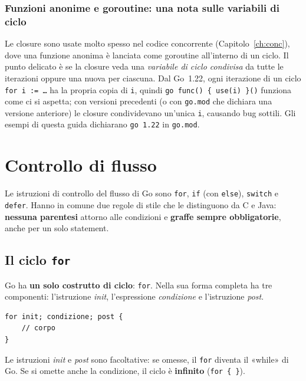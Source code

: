 \documentclass[11pt,a4paper]{report}
\newcommand{\cod}[1]{\texttt{#1}}
\begin{document}
\subsection{Funzioni anonime e goroutine: una nota sulle variabili di ciclo}

Le closure sono usate molto spesso nel codice concorrente (Capitolo~\ref{ch:conc}),
dove una funzione anonima è lanciata come goroutine all'interno di un ciclo. Il
punto delicato è se la closure veda una \emph{variabile di ciclo condivisa} da
tutte le iterazioni oppure una nuova per ciascuna. Dal Go~1.22, ogni iterazione
di un ciclo \cod{for i := \ldots} ha la propria copia di \cod{i}, quindi
\cod{go func() \{ use(i) \}()} funziona come ci si aspetta; con versioni
precedenti (o con \texttt{go.mod} che dichiara una versione anteriore) le closure
condividevano un'unica \cod{i}, causando bug sottili. Gli esempi di questa guida
dichiarano \cod{go 1.22} in \texttt{go.mod}.

\chapter{Controllo di flusso}\label{ch:flusso}

Le istruzioni di controllo del flusso di Go sono \cod{for}, \cod{if} (con
\cod{else}), \cod{switch} e \cod{defer}. Hanno in comune due regole di stile
che le distinguono da C e Java: \textbf{nessuna parentesi} attorno alle
condizioni e \textbf{graffe sempre obbligatorie}, anche per un solo statement.

\section{Il ciclo \texttt{for}}\label{sec:for}

Go ha \textbf{un solo costrutto di ciclo}: \cod{for}. Nella sua forma completa ha
tre componenti: l'istruzione \emph{init}, l'espressione \emph{condizione} e
l'istruzione \emph{post}.

\begin{lstlisting}[style=gocode,numbers=none,caption={Forma generale}]
for init; condizione; post {
	// corpo
}
\end{lstlisting}

Le istruzioni \emph{init} e \emph{post} sono facoltative: se omesse, il
\cod{for} diventa il «while» di Go. Se si omette anche la condizione, il ciclo è
\textbf{infinito} (\cod{for \{ \}}).
\end{document}
